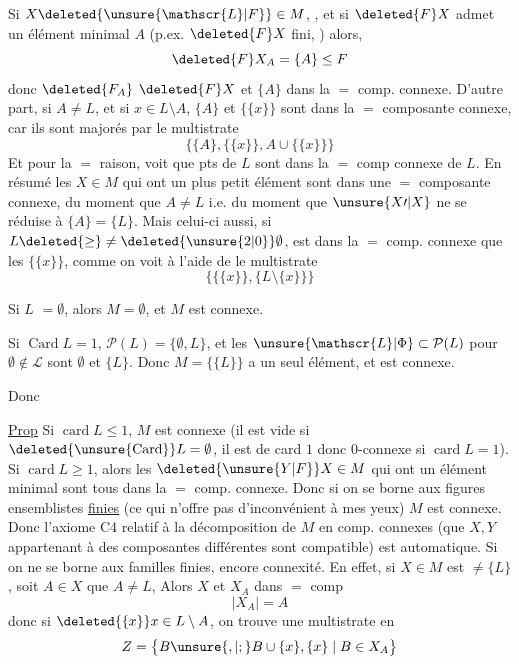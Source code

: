 Si $X\deleted{\unsure{\mathscr{L}|F}}\in M$,  , et si $\deleted{F}X$ admet un  élément minimal $A$ (p.ex. $\deleted{F}X$ fini, ) alors,
\[
\deleted{F}X_A=\{A\}\leq F
\]
 donc $\deleted{F_A}$  $\deleted{F}X$ et $\{A\}$ dans la $=$ comp. connexe. D'autre part,  si $A\ne L$, et si $x\in L\setminus A$, $\{A\}$ et $\{\{x\}\}$ sont dans la $=$ composante connexe, car ils sont majorés par le multistrate
\[
\bigl\{\{A\},\{\{x\}\},A\cup\{\{x\}\}\bigr\}
\]
 Et pour la $=$ raison,    voit que   pts de $L$ sont dans la $=$ comp connexe de $L$. En résumé les $X\in M$ qui ont un plus petit élément  sont dans une $=$ composante connexe, du moment que $A\ne L$ i.e. du moment que $\unsure{X\prime|X}$ ne se réduise à $\{A\}=\{L\}$. Mais celui-ci aussi, si  $L\deleted{\geq}\ne\deleted{\unsure{2|0}}\emptyset$, est dans la
$=$ comp. connexe que les $\{\{x\}\}$, comme on voit à l'aide de le multistrate
\[
\bigl\{\{\{x\}\},\{L\setminus\{x\}\}\bigr\}
\]

Si $L$  $=\emptyset$,   alors $M=\emptyset$, et $M$ est connexe.

Si $\operatorname{Card}L=1$, $\mathcal P(L)=\{\emptyset,L\}$, et les $\unsure{\mathscr{L}|\Phi}\subset\mathcal P(L)$    pour $\emptyset\notin\mathscr{L}$ sont $\emptyset$ et $\{L\}$. Donc $M=\{\{L\}\}$ a un seul élément, et est connexe.

Donc

\uline{Prop} Si $\operatorname{card}L\leq1$, $M$ est connexe (il est vide si $\deleted{\unsure{\mathrm{Card}}}L=\emptyset$, il est de card $1$ donc $0$-connexe si $\operatorname{card}L=1$). Si $\operatorname{card}L\geq1$, alors les $\deleted{\unsure{Y|F}}X\in M$ qui ont un élément minimal sont tous dans la $=$ comp. connexe. Donc si on se borne aux  figures ensemblistes \uline{finies} (ce qui n'offre pas d'inconvénient à mes yeux) $M$ est connexe. Donc l'axiome C4  relatif à la décomposition de $M$ en comp. connexes (que $X,Y$ appartenant à des composantes différentes sont compatible) est automatique.
Si on ne se borne aux familles finies,  encore connexité. En effet, si $X\in M$ est $\ne\{L\}$, soit $A\in X$  que $A\ne L$, Alors $X$ et $X_A$ dans $=$ comp 
\[
\lvert X_A\rvert=A
\]
donc si $\deleted{\{x\}}x\in L\setminus A$, on trouve une multistrate en 
\[
Z=\bigl\{B\unsure{,|;}B\cup\{x\},\{x\}\mid B\in X_A\bigr\}
\]

